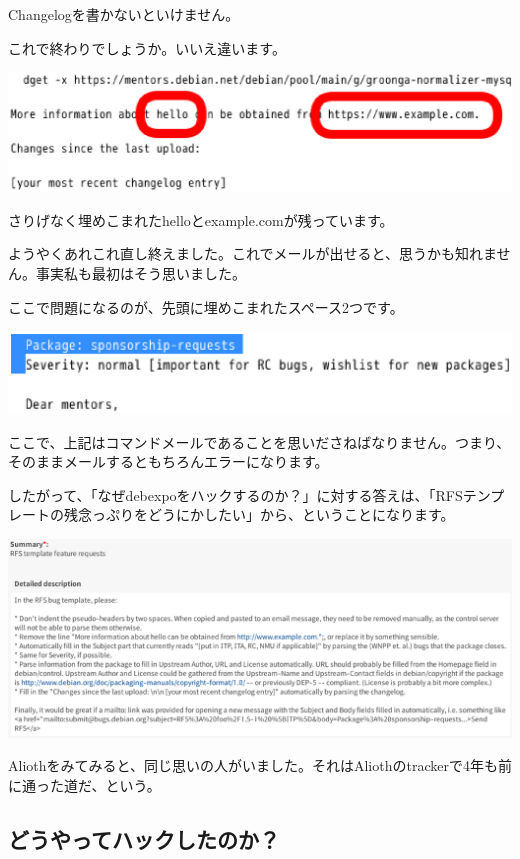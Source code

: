 \documentclass[mingoth,a4paper]{jsarticle}
\begin{document}
Changelogを書かないといけません。

これで終わりでしょうか。いいえ違います。

\begin{screen}
\includegraphics[width=0.5\hsize]{image201606/rfs-template-fill-in5.eps}
\end{screen}

さりげなく埋めこまれたhelloとexample.comが残っています。

ようやくあれこれ直し終えました。これでメールが出せると、思うかも知れません。事実私も最初はそう思いました。

ここで問題になるのが、先頭に埋めこまれたスペース2つです。

\begin{screen}
\includegraphics[width=0.5\hsize]{image201606/rfs-template-pithole3.eps}
\end{screen}

ここで、上記はコマンドメールであることを思いださねばなりません。つまり、そのままメールするともちろんエラーになります。

したがって、「なぜdebexpoをハックするのか？」に対する答えは、「RFSテンプレートの残念っぷりをどうにかしたい」から、ということになります。

\begin{screen}
\includegraphics[width=1.0\hsize]{image201606/alioth-debexpo-313593-request.eps}
\end{screen}

Aliothをみてみると、同じ思いの人がいました。それはAliothのtrackerで4年も前に通った道だ、という。

\subsection{どうやってハックしたのか？}
\end{document}
